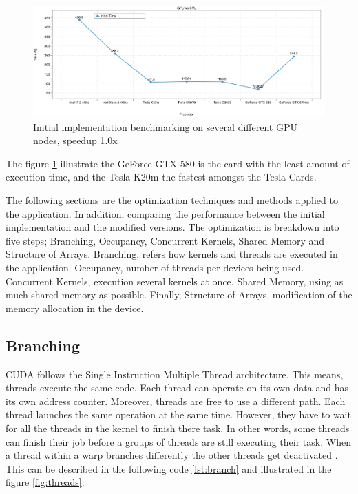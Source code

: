   \begin{figure}[htbp]
	\centering
		\includegraphics[width=1.0\textwidth]{Figures/gpu_initial.png}
		\smallskip
	\caption[Initial GPU results]{Initial implementation benchmarking on several different GPU nodes, speedup 1.0x}
	\label{fig:iniresults}
\end{figure}

The figure \ref{fig:iniresults} illustrate the GeForce GTX 580 is the card with the least amount of execution time, and the Tesla K20m the fastest amongst the Tesla Cards.


The following sections are the optimization techniques and methods applied to the application. In addition, comparing the performance between the initial implementation and the modified versions. The optimization is breakdown into five steps; Branching, Occupancy, Concurrent Kernels, Shared Memory and Structure of Arrays. Branching, refers how kernels and threads are executed in the application. Occupancy, number of threads per devices being used. Concurrent Kernels, execution several kernels at once. Shared Memory, using as much shared memory as possible. Finally, Structure of Arrays, modification of the memory allocation in the device.

 \subsection{Branching}
 
 CUDA follows the Single Instruction Multiple Thread architecture. This means, threads execute the same code. Each thread can operate on its own data and has its own address counter. Moreover, threads are free to use a different path. Each thread launches the same operation at the same time. However, they have to wait for all the threads in the kernel to finish there task. In other words, some threads can finish their job before a groups of threads are still executing their task. When a thread within a warp branches differently the other threads get deactivated \cite{hoermanngpu}. This can be described in the following code \ref{lst:branch} and  illustrated in the figure \ref{fig:threads}.

